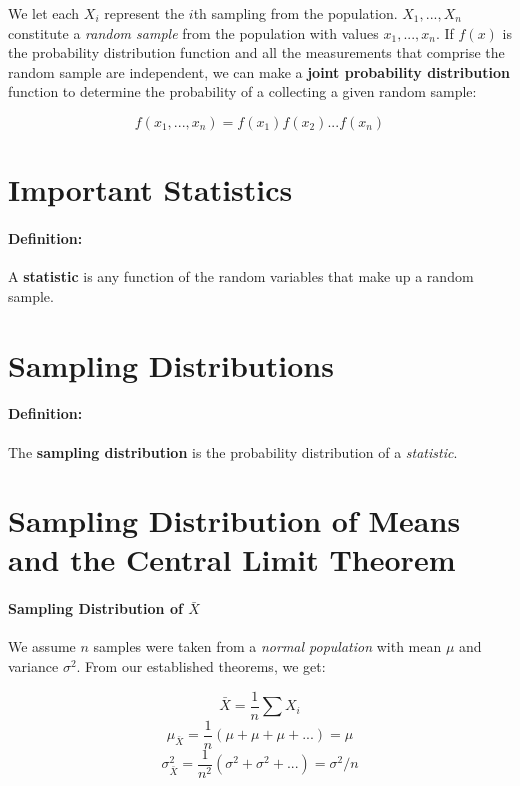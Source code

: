 \documentclass[a4paper,12pt]{report}
\begin{document}
We let each $X_i$ represent the $i$th sampling from the population. $X_1, ..., X_n$ constitute a \textit{random sample} from the population with values $x_1,...,x_n$. If $f(x)$ is the probability distribution function and all the measurements that comprise the random sample are independent, we can make a \textbf{joint probability distribution} function to determine the probability of a collecting a given random sample: 

$$f(x_1, ..., x_n) = f(x_1)f(x_2)...f(x_n)$$

\section{Important Statistics}

\paragraph{Definition: } A \textbf{statistic} is any function of the random variables that make up a random sample.



\section{Sampling Distributions}

\paragraph{Definition: } The \textbf{sampling distribution} is the probability distribution of a \textit{statistic}. 


\section{Sampling Distribution of Means and the Central Limit Theorem}

\paragraph{Sampling Distribution of $\bar{X}$} 

We assume $n$ samples were taken from a \textit{normal population} with mean $\mu$ and variance $\sigma^2$. From our established theorems, we get: 

$$\bar{X} = \frac{1}{n} \sum X_i$$
$$\mu_{\bar{X}} = \frac{1}{n} (\mu + \mu + \mu + ...) = \mu$$
$$\sigma^2_{\bar{X}} = \frac{1}{n^2} (\sigma^2 + \sigma^2 + ...) = \sigma^2/n$$
\end{document}
